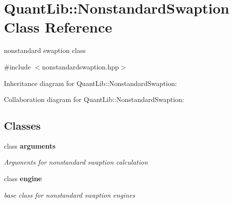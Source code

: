 \section{Quant\+Lib\+:\+:Nonstandard\+Swaption Class Reference}
\label{class_quant_lib_1_1_nonstandard_swaption}


nonstandard swaption class  




{\ttfamily \#include $<$nonstandardswaption.\+hpp$>$}



Inheritance diagram for Quant\+Lib\+:\+:Nonstandard\+Swaption\+:


Collaboration diagram for Quant\+Lib\+:\+:Nonstandard\+Swaption\+:
\subsection*{Classes}
\begin{DoxyCompactItemize}
\item 
class {\bf arguments}
\begin{DoxyCompactList}\small\item\em Arguments for nonstandard swaption calculation \end{DoxyCompactList}\item 
class {\bf engine}
\begin{DoxyCompactList}\small\item\em base class for nonstandard swaption engines \end{DoxyCompactList}\end{DoxyCompactItemize}
